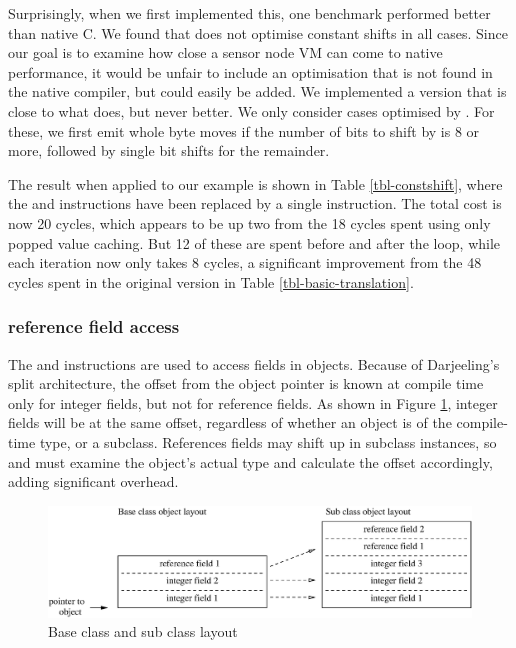 Surprisingly, when we first implemented this, one benchmark performed better than native C. We found that  does not optimise constant shifts in all cases. Since our goal is to examine how close a sensor node VM can come to native performance, it would be unfair to include an optimisation that is not found in the native compiler, but could easily be added. We implemented a version that is close to what  does, but never better. We only consider cases optimised by . For these, we first emit whole byte moves if the number of bits to shift by is 8 or more, followed by single bit shifts for the remainder.

The result when applied to our example is shown in Table \ref{tbl-constshift}, where the  and  instructions have been replaced by a single  instruction. The total cost is now 20 cycles, which appears to be up two from the 18 cycles spent using only popped value caching. But 12 of these are spent before and after the loop, while each iteration now only takes 8 cycles, a significant improvement from the 48 cycles spent in the original version in Table \ref{tbl-basic-translation}.


\subsubsection{ reference field access}
The  and  instructions are used to access fields in objects. Because of Darjeeling's split architecture, the offset from the object pointer is known at compile time only for integer fields, but not for reference fields. As shown in Figure \ref{fig-super-class-sub-class-field-layout}, integer fields will be at the same offset, regardless of whether an object is of the compile-time type, or a subclass. References fields may shift up in subclass instances, so  and  must examine the object's actual type and calculate the offset accordingly, adding significant overhead.

\begin{figure}
\centering
\includegraphics[width=0.7\linewidth]{super-class-sub-class-field-layout.eps}
\caption{Base class and sub class layout}
\label{fig-super-class-sub-class-field-layout}
\end{figure}

